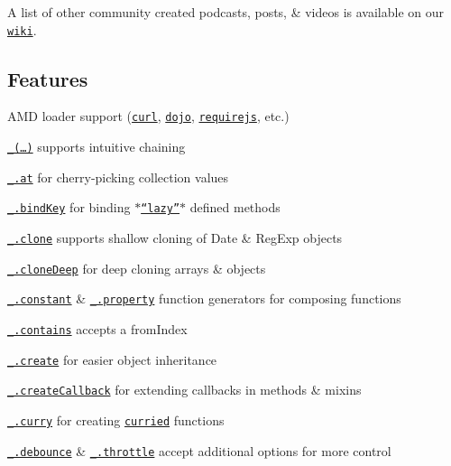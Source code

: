 A list of other community created podcasts, posts, \& videos is available on our \href{https://github.com/lodash/lodash/wiki/Resources}{\tt wiki}.

\subsection*{Features}


\begin{DoxyItemize}
\item A\+M\+D loader support (\href{https://github.com/cujojs/curl}{\tt curl}, \href{http://dojotoolkit.org/}{\tt dojo}, \href{http://requirejs.org/}{\tt requirejs}, etc.)
\item \href{https://lodash.com/docs#_}{\tt \+\_\+(…)} supports intuitive chaining
\item \href{https://lodash.com/docs#at}{\tt \+\_\+.\+at} for cherry-\/picking collection values
\item \href{https://lodash.com/docs#bindKey}{\tt \+\_\+.\+bind\+Key} for binding \href{http://michaux.ca/articles/lazy-function-definition-pattern}{\tt $\ast$“lazy”$\ast$} defined methods
\item \href{https://lodash.com/docs#clone}{\tt \+\_\+.\+clone} supports shallow cloning of {\ttfamily Date} \& {\ttfamily Reg\+Exp} objects
\item \href{https://lodash.com/docs#cloneDeep}{\tt \+\_\+.\+clone\+Deep} for deep cloning arrays \& objects
\item \href{https://lodash.com/docs#constant}{\tt \+\_\+.\+constant} \& \href{https://lodash.com/docs#property}{\tt \+\_\+.\+property} function generators for composing functions
\item \href{https://lodash.com/docs#contains}{\tt \+\_\+.\+contains} accepts a {\ttfamily from\+Index}
\item \href{https://lodash.com/docs#create}{\tt \+\_\+.\+create} for easier object inheritance
\item \href{https://lodash.com/docs#createCallback}{\tt \+\_\+.\+create\+Callback} for extending callbacks in methods \& mixins
\item \href{https://lodash.com/docs#curry}{\tt \+\_\+.\+curry} for creating \href{http://hughfdjackson.com/javascript/2013/07/06/why-curry-helps/}{\tt curried} functions
\item \href{https://lodash.com/docs#debounce}{\tt \+\_\+.\+debounce} \& \href{https://lodash.com/docs#throttle}{\tt \+\_\+.\+throttle} accept additional {\ttfamily options} for more control

\end{DoxyItemize}
